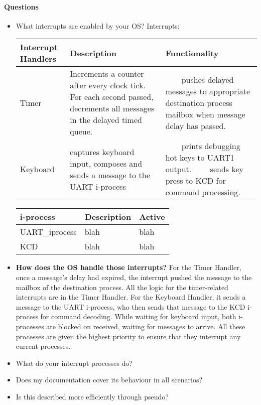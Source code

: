 \documentclass[11pt, oneside]{article}
\newcommand{\tabitem}{~~\llap{\textbullet}~~}
\begin{document}
\paragraph{Questions}
\begin{itemize}
\item What interrupts are enabled by your OS?
Interrupts:
\newline
\begin{tabular}{|L{2cm}|L{5cm}|L{5cm}|} \hline
 \textbf{Interrupt Handlers} & \textbf{Description} & \textbf{Functionality} \\ \hline
Timer & 
Increments a counter after every clock tick. For each second passed, decrements all messages in the delayed timed queue.
& 
\tabitem pushes delayed messages to appropriate destination process mailbox when message delay has passed.

\\ \hline
Keyboard & captures keyboard input, composes and sends a message to the UART i-process & 

\tabitem prints debugging hot keys to UART1 output. \newline
\tabitem sends key press to KCD for command processing. \\ \hline
\end{tabular}

\begin{tabular}{|L{3cm}|L{4cm}|L{5cm}|} \hline
\textbf{i-process}& Description & Active \\ \hline
UART\_iprocess& blah & blah \\ \hline
KCD& blah & blah \\ \hline
\end{tabular}
\item \textbf{How does the OS handle those interrupts?} For the Timer Handler, once a message's delay had expired, the interrupt pushed the message to the mailbox of the destination process. All the logic for the timer-related interrupts are in the Timer Handler. For the Keyboard Handler, it sends a message to the UART i-process, who then sends that message to the KCD i-process for command decoding. While waiting for keyboard input, both i-processes are blocked on received, waiting for messages to arrive. All these processes are given the highest priority to ensure that they interrupt any current processes.

\item What do your interrupt processes do?
\item Does my documentation cover its behaviour in all scenarios?
\item Is this described more efficiently through pseudo?
\end{itemize}
\end{document}
